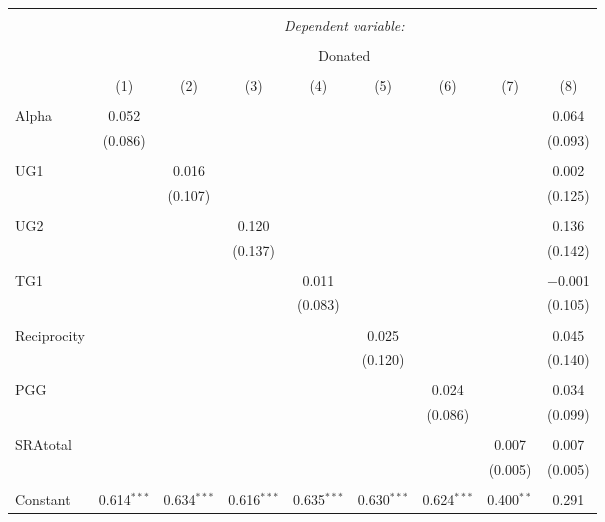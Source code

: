 \documentclass[12pt]{article}
\begin{document}
\begin{table}[!htbp] \centering 
  \caption{} 
  \label{} 
            \begin{adjustbox}{width=\textwidth}
\begin{tabular}{@{\extracolsep{5pt}}lcccccccc} 
\\[-1.8ex]\hline 
\hline \\[-1.8ex] 
 & \multicolumn{8}{c}{\textit{Dependent variable:}} \\ 
\cline{2-9} 
\\[-1.8ex] & \multicolumn{8}{c}{Donated} \\ 
\\[-1.8ex] & (1) & (2) & (3) & (4) & (5) & (6) & (7) & (8)\\ 
\hline \\[-1.8ex] 
 Alpha & 0.052 &  &  &  &  &  &  & 0.064 \\ 
  & (0.086) &  &  &  &  &  &  & (0.093) \\ 
  & & & & & & & & \\ 
 UG1 &  & 0.016 &  &  &  &  &  & 0.002 \\ 
  &  & (0.107) &  &  &  &  &  & (0.125) \\ 
  & & & & & & & & \\ 
 UG2 &  &  & 0.120 &  &  &  &  & 0.136 \\ 
  &  &  & (0.137) &  &  &  &  & (0.142) \\ 
  & & & & & & & & \\ 
 TG1 &  &  &  & 0.011 &  &  &  & $-$0.001 \\ 
  &  &  &  & (0.083) &  &  &  & (0.105) \\ 
  & & & & & & & & \\ 
 Reciprocity &  &  &  &  & 0.025 &  &  & 0.045 \\ 
  &  &  &  &  & (0.120) &  &  & (0.140) \\ 
  & & & & & & & & \\ 
 PGG &  &  &  &  &  & 0.024 &  & 0.034 \\ 
  &  &  &  &  &  & (0.086) &  & (0.099) \\ 
  & & & & & & & & \\ 
 SRAtotal &  &  &  &  &  &  & 0.007 & 0.007 \\ 
  &  &  &  &  &  &  & (0.005) & (0.005) \\ 
  & & & & & & & & \\ 
 Constant & 0.614$^{***}$ & 0.634$^{***}$ & 0.616$^{***}$ & 0.635$^{***}$ & 0.630$^{***}$ & 0.624$^{***}$ & 0.400$^{**}$ & 0.291 \\ 

\end{tabular}
\end{adjustbox}
\end{table}
\end{document}
